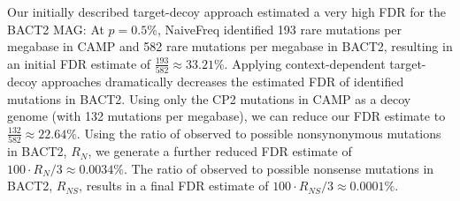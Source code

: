 Our initially described target-decoy approach estimated a very high FDR for the BACT2 MAG:
At $p = 0.5\%$, NaiveFreq identified 193 rare mutations per megabase in CAMP and 582 rare mutations per megabase in BACT2, resulting in an initial FDR estimate of $\frac{193}{582} \approx 33.21\%$.
Applying context-dependent target-decoy approaches dramatically decreases the estimated FDR of identified mutations in BACT2.
Using only the CP2 mutations in CAMP as a decoy genome (with 132 mutations per megabase), we can reduce our FDR estimate to $\frac{132}{582} \approx 22.64\%$.
Using the ratio of observed to possible nonsynonymous mutations in BACT2, $R_N$, we generate a further reduced FDR estimate of $100 \cdot R_N / 3 \approx 0.0034\%$.
The ratio of observed to possible nonsense mutations in BACT2, $R_{NS}$, results in a final FDR estimate of $100 \cdot R_{NS} / 3 \approx 0.0001\%$.\endinput